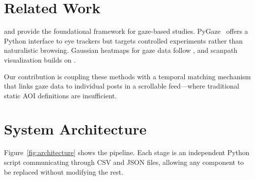 \documentclass[11pt,a4paper]{article}
\begin{document}
\section{Related Work}
\label{sec:related}

\citet{duchowski2017eye} and \citet{holmqvist2011eye} provide the
foundational framework for gaze-based studies. PyGaze~\citep{dalmaijer2014pygaze}
offers a Python interface to eye trackers but targets controlled experiments
rather than naturalistic browsing. Gaussian heatmaps for gaze data follow
\citet{wooding2002fixation}, and scanpath visualization builds on
\citet{noton1971scanpaths}.

Our contribution is coupling these methods with a temporal matching
mechanism that links gaze data to individual posts in a scrollable
feed---where traditional static AOI definitions are insufficient.

\section{System Architecture}
\label{sec:architecture}

Figure~\ref{fig:architecture} shows the pipeline. Each stage is an
independent Python script communicating through CSV and JSON files,
allowing any component to be replaced without modifying the rest.
\end{document}
